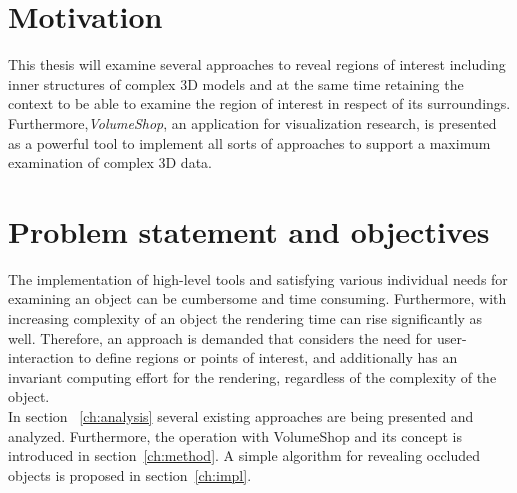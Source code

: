 \section{Motivation}
This thesis will examine several approaches to reveal regions of interest including inner structures of complex 3D models and at the same time retaining the context to be able to examine the region of interest in respect of its surroundings. Furthermore,\emph{VolumeShop}, an application for visualization research, is presented as a powerful tool to implement all sorts of approaches to support a maximum examination of complex 3D data.

\section{Problem statement and objectives}
The implementation of high-level tools and satisfying various individual needs for examining an object can be cumbersome and time consuming. Furthermore, with increasing complexity of an object the rendering time can rise significantly as well. Therefore, an approach is demanded that considers the need for user-interaction to define regions or points of interest, and additionally has an invariant computing effort for the rendering, regardless of the complexity of the object.\\
\newline
In section ~\ref{ch:analysis} several existing approaches are being presented and analyzed. Furthermore, the operation with VolumeShop and its concept is introduced in section~\ref{ch:method}. A simple algorithm for revealing occluded objects is proposed in section~\ref{ch:impl}.
